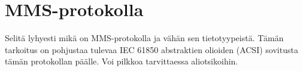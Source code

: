 \chapter{MMS-protokolla}
\label{ch:mms-protokolla}
Selitä lyhyesti mikä on MMS-protokolla ja vähän sen tietotyypeistä. Tämän tarkoitus on pohjustaa tulevaa IEC 61850 abstraktien olioiden (ACSI) sovitusta tämän protokollan päälle. Voi pilkkoa tarvittaessa aliotsikoihin.